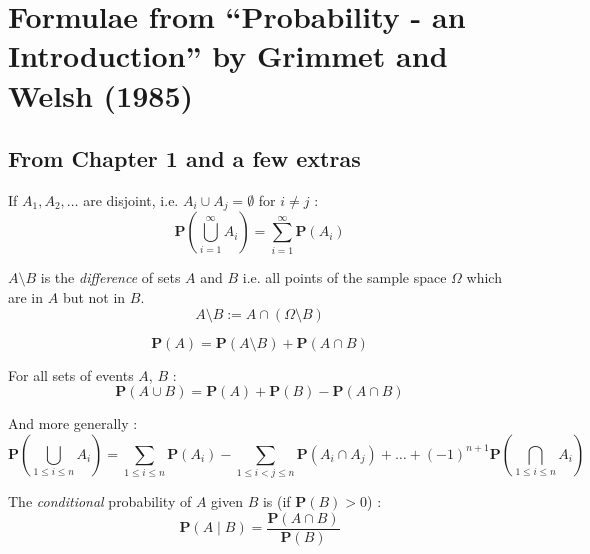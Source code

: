 \section{Formulae from ``Probability - an Introduction'' by Grimmet and Welsh (1985)}
\subsection{From Chapter 1 and a few extras}

If $A_1, A_2, \ldots$ are disjoint, i.e. $A_i \cup A_j = \emptyset$ for $i \neq j$ : 
\begin{equation} 
\mathbf{P} (\bigcup_{i=1}^\infty A_i) = \sum_{i=1}^\infty \mathbf{P}(A_i) 
\tag{F1.1} \label{Formula1.1}
\end{equation}


$A \setminus B$ is the \emph{difference} of sets $A$ and $B$ i.e. all points of the sample space $\Omega$ which are in $A$ but not in $B$. 
\begin{equation} 
A \setminus B := A \cap (\Omega \setminus B)  
\tag{F1.2} \label{Formula1.2}
\end{equation}


\begin{equation} 
\mathbf{P}(A) = \mathbf{P}(A \setminus B) + \mathbf{P} (A \cap B)  
\tag{F1.3} \label{Formula1.3}
\end{equation}

For all sets of events $A$, $B$ : 
\begin{equation} 
\mathbf{P}(A \cup B) = \mathbf{P}(A) + \mathbf{P}(B) - \mathbf{P} (A \cap B)  
\tag{F1.4} \label{Formula1.4}
\end{equation}

And more generally : 
\begin{equation} 
\mathbf{P} (\bigcup_{1 \leq i \leq n} A_i) = \sum_{1 \leq i \leq n} \mathbf{P}(A_i) - 
\sum_{1 \leq i < j \leq n} \mathbf{P}(A_i \cap A_j) + \ldots 
+ (-1)^{n+1} \mathbf{P}(\bigcap_{1 \leq i \leq n} A_i) 
   \tag{F1.5} \label{Formula1.5}
\end{equation}

The \emph{conditional} probability of $A$ given $B$ is (if ${\mathbf{P}(B)} > 0$) :
\begin{equation} 
\mathbf{P} (A \mid B) = \frac{\mathbf{P}(A \cap B)} {\mathbf{P}(B)}   
   \tag{F1.6} \label{Formula1.6}
\end{equation}


